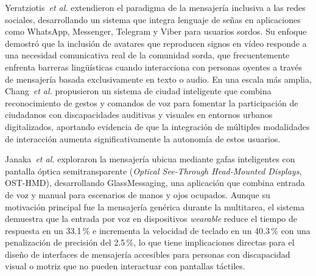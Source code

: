 \documentclass[journal]{IEEEtran}
\begin{document}
				Yeratziotis~\textit{et al.} \cite{yeratziotis2023} extendieron el paradigma de la mensajer\'ia inclusiva a las redes sociales, desarrollando un sistema que integra lenguaje de se\~nas en aplicaciones como WhatsApp, Messenger, Telegram y Viber para usuarios sordos. Su enfoque demostr\'o que la inclusi\'on de avatares que reproducen signos en v\'ideo responde a una necesidad comunicativa real de la comunidad sorda, que frecuentemente enfrenta barreras ling\"u\'isticas cuando interacciona con personas oyentes a trav\'es de mensajer\'ia basada exclusivamente en texto o audio. En una escala m\'as amplia, Chang~\textit{et al.} \cite{chang2022} propusieron un sistema de ciudad inteligente que combina reconocimiento de gestos y comandos de voz para fomentar la participaci\'on de ciudadanos con discapacidades auditivas y visuales en entornos urbanos digitalizados, aportando evidencia de que la integraci\'on de m\'ultiples modalidades de interacci\'on aumenta significativamente la autonom\'ia de estos usuarios.
				
				Janaka~\textit{et al.} \cite{janaka2023} exploraron la mensajer\'ia ubicua mediante gafas inteligentes con pantalla \'optica semitransparente (\textit{Optical See-Through Head-Mounted Displays}, OST-HMD), desarrollando GlassMessaging, una aplicaci\'on que combina entrada de voz y manual para escenarios de manos y ojos ocupados. Aunque su motivaci\'on principal fue la mensajer\'ia gen\'erica durante la multitarea, el sistema demuestra que la entrada por voz en dispositivos \textit{wearable} reduce el tiempo de respuesta en un 33.1\,\% e incrementa la velocidad de teclado en un 40.3\,\% con una penalizaci\'on de precisi\'on del 2.5\,\%, lo que tiene implicaciones directas para el dise\~no de interfaces de mensajer\'ia accesibles para personas con discapacidad visual o motriz que no pueden interactuar con pantallas t\'actiles.
			
\end{document}
